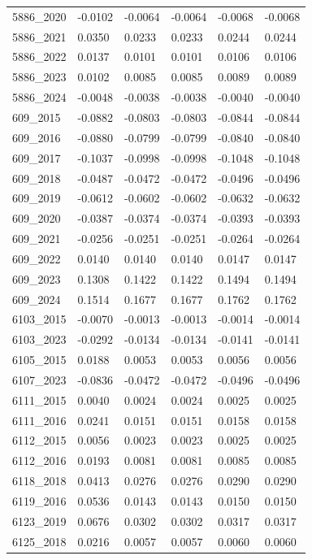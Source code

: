 \begin{table}[htbp]
\begin{tabular}{llllll}
5886_2020 & -0.0102 & -0.0064 & -0.0064 & -0.0068 & -0.0068 \\
5886_2021 & 0.0350 & 0.0233 & 0.0233 & 0.0244 & 0.0244 \\
5886_2022 & 0.0137 & 0.0101 & 0.0101 & 0.0106 & 0.0106 \\
5886_2023 & 0.0102 & 0.0085 & 0.0085 & 0.0089 & 0.0089 \\
5886_2024 & -0.0048 & -0.0038 & -0.0038 & -0.0040 & -0.0040 \\
609_2015 & -0.0882 & -0.0803 & -0.0803 & -0.0844 & -0.0844 \\
609_2016 & -0.0880 & -0.0799 & -0.0799 & -0.0840 & -0.0840 \\
609_2017 & -0.1037 & -0.0998 & -0.0998 & -0.1048 & -0.1048 \\
609_2018 & -0.0487 & -0.0472 & -0.0472 & -0.0496 & -0.0496 \\
609_2019 & -0.0612 & -0.0602 & -0.0602 & -0.0632 & -0.0632 \\
609_2020 & -0.0387 & -0.0374 & -0.0374 & -0.0393 & -0.0393 \\
609_2021 & -0.0256 & -0.0251 & -0.0251 & -0.0264 & -0.0264 \\
609_2022 & 0.0140 & 0.0140 & 0.0140 & 0.0147 & 0.0147 \\
609_2023 & 0.1308 & 0.1422 & 0.1422 & 0.1494 & 0.1494 \\
609_2024 & 0.1514 & 0.1677 & 0.1677 & 0.1762 & 0.1762 \\
6103_2015 & -0.0070 & -0.0013 & -0.0013 & -0.0014 & -0.0014 \\
6103_2023 & -0.0292 & -0.0134 & -0.0134 & -0.0141 & -0.0141 \\
6105_2015 & 0.0188 & 0.0053 & 0.0053 & 0.0056 & 0.0056 \\
6107_2023 & -0.0836 & -0.0472 & -0.0472 & -0.0496 & -0.0496 \\
6111_2015 & 0.0040 & 0.0024 & 0.0024 & 0.0025 & 0.0025 \\
6111_2016 & 0.0241 & 0.0151 & 0.0151 & 0.0158 & 0.0158 \\
6112_2015 & 0.0056 & 0.0023 & 0.0023 & 0.0025 & 0.0025 \\
6112_2016 & 0.0193 & 0.0081 & 0.0081 & 0.0085 & 0.0085 \\
6118_2018 & 0.0413 & 0.0276 & 0.0276 & 0.0290 & 0.0290 \\
6119_2016 & 0.0536 & 0.0143 & 0.0143 & 0.0150 & 0.0150 \\
6123_2019 & 0.0676 & 0.0302 & 0.0302 & 0.0317 & 0.0317 \\
6125_2018 & 0.0216 & 0.0057 & 0.0057 & 0.0060 & 0.0060 \\

\end{tabular}
\end{table}
